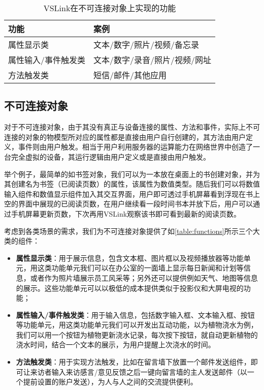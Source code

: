 \begin{table}[htbp]
	\caption{VSLink在不可连接对象上实现的功能}  \label{table:functions}  
	\begin{center}  
		\begin{tabular}{|l|l|}  
			\hline  
			\textbf{功能} & \textbf{案例} \\ \hline  
			属性显示类 & 文本/数字/照片/视频/备忘录   \\ \hline 
			属性输入/事件触发类 & 文本/数字/录音/照片/视频/网址   \\ \hline 
			方法触发类 & 短信/邮件/其他应用   \\ \hline  
		\end{tabular}  
	\end{center}  
\end{table}

\subsection{不可连接对象}
对于不可连接对象，由于其没有真正与设备连接的属性、方法和事件，实际上不可连接的对象的物模型所对应的属性都是直接由用户自行创建的，其方法由用户定义，事件则由用户触发。相当于用户利用服务器的运算能力在网络世界中创造了一台完全虚拟的设备，其运行逻辑由用户定义或是直接由用户触发。

举个例子，最简单的如书签对象，我们可以为一本放在桌面上的书创建对象，并为其创建名为书签（已阅读页数）的属性，该属性为数值类型。随后我们可以将数值输入组件和数值显示组件加入其交互界面，用户即可透过手机屏幕看到浮现在书上空的界面中展现的已阅读页数，在用户继续看一段时间书本并放下后，用户可以通过手机屏幕更新页数，下次再用VSLink观察该书即可看到最新的阅读页数。

考虑到各类场景的需求，我们为不可连接对象提供了如\autoref{table:functions}所示三个大类的组件：

\begin{itemize}
	\item \textbf{属性显示类}：用于展示信息，包含文本框、图片框以及视频播放器等功能单元，用这类功能单元我们可以在办公室的一面墙上显示每日新闻和计划等信息，或者作为照片墙展示员工风采等；另外还可以提供例如天气、地图等信息的展示。这些功能单元可以以极低的成本提供类似于投影仪和大屏电视的功能；
	\item \textbf{属性输入/事件触发类}：用于输入信息，包括数字输入框、文本输入框、按钮等功能单元，用这类功能单元我们可以开发出互动功能，以为植物浇水为例，我们可以用一个按钮为植物更新浇水记录，每次按下按钮，就自动更新植物的浇水时间，结合一个文本的展示，为用户提醒上次浇水的时间。
	\item \textbf{方法触发类}：用于实现方法触发，比如在留言墙下放置一个邮件发送组件，即可让来访者输入来访感言/意见反馈之后一键向留言墙的主人发送邮件（以一个提前设置的账户发送），为人与人之间的交流提供便利。
\end{itemize}
 
